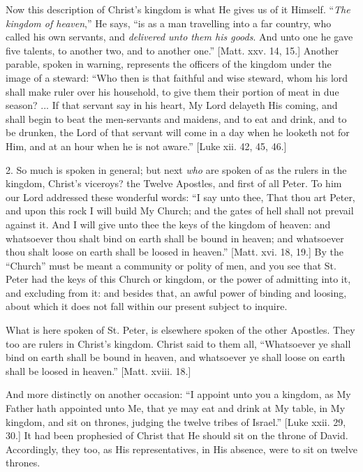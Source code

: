 Now this description of Christ's kingdom is what He gives us of it
Himself. ``\emph{The kingdom of heaven},'' He says, ``is
as a man travelling into a far country, who called his own servants,
and \emph{delivered unto them his goods}. And unto one he gave five
talents, to another two, and to another one.'' [Matt. xxv. 14,
15.] Another parable, spoken in warning, represents the officers of
the kingdom under the image of a steward: ``Who then is that
faithful and wise steward, whom his lord shall make ruler over his
household, to give them their portion of meat in due season? ... If
that servant say in his heart, My Lord delayeth His coming, and shall
begin to beat the men-servants and maidens, and to eat and drink, and
to be drunken, the Lord of that servant will come in a day when he
looketh not for Him, and at an hour when he is not aware.'' [Luke
xii. 42, 45, 46.]

2. So much is spoken in general; but next \emph{who} are spoken of
as the rulers in the kingdom, Christ's viceroys? the Twelve Apostles,
and first of all Peter. To him our Lord addressed these wonderful
words: ``I say unto thee, That thou art Peter, and upon this rock
I will build My Church; and the gates of hell shall not prevail
against it. And I will give unto thee the keys of the kingdom of
heaven: and whatsoever thou shalt bind on earth shall be bound in
heaven; and whatsoever thou shalt loose on earth shall be loosed in
heaven.'' [Matt. xvi. 18, 19.] By the ``Church'' must be
meant a community or polity of men, and you see that St. Peter had the
keys of this Church or kingdom, or the power of admitting into it, and
excluding from it: and besides that, an awful power of binding and
loosing, about which it does not fall within our present subject to
inquire.

What is here spoken of St. Peter, is elsewhere spoken of the other
Apostles. They too are rulers in Christ's kingdom. Christ said to them
all, ``Whatsoever ye shall bind on earth shall be bound in heaven,
and whatsoever ye shall loose on earth shall be loosed in
heaven.'' [Matt. xviii. 18.]

And more distinctly on another occasion: ``I appoint unto you a
kingdom, as My Father hath appointed unto Me, that ye may eat and
drink at My table, in My kingdom, and sit on thrones, judging the
twelve tribes of Israel.'' [Luke xxii. 29, 30.] It had been
prophesied of Christ that He should sit on the throne of David.
Accordingly, they too, as His representatives, in His absence, were to
sit on twelve thrones.

